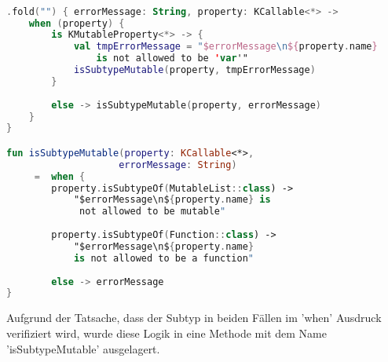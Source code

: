 \begin{lstlisting}[caption={fold}, label={lst:fold}, language=Kotlin]

.fold("") { errorMessage: String, property: KCallable<*> ->
	when (property) {
		is KMutableProperty<*> -> {
			val tmpErrorMessage = "$errorMessage\n${property.name} 
				is not allowed to be 'var'"
			isSubtypeMutable(property, tmpErrorMessage)
		}
		
		else -> isSubtypeMutable(property, errorMessage)
	}
}

fun isSubtypeMutable(property: KCallable<*>, 
					errorMessage: String)
	 =	when {
		property.isSubtypeOf(MutableList::class) ->
			"$errorMessage\n${property.name} is 
			 not allowed to be mutable"
	
		property.isSubtypeOf(Function::class) ->
			"$errorMessage\n${property.name} 
			is not allowed to be a function"
	
		else -> errorMessage
}

\end{lstlisting}
\bigskip
Aufgrund der Tatsache, dass der Subtyp in beiden Fällen im 'when' Ausdruck verifiziert wird, wurde diese Logik in eine Methode mit dem Name 'isSubtypeMutable' ausgelagert.
\\\\ 
